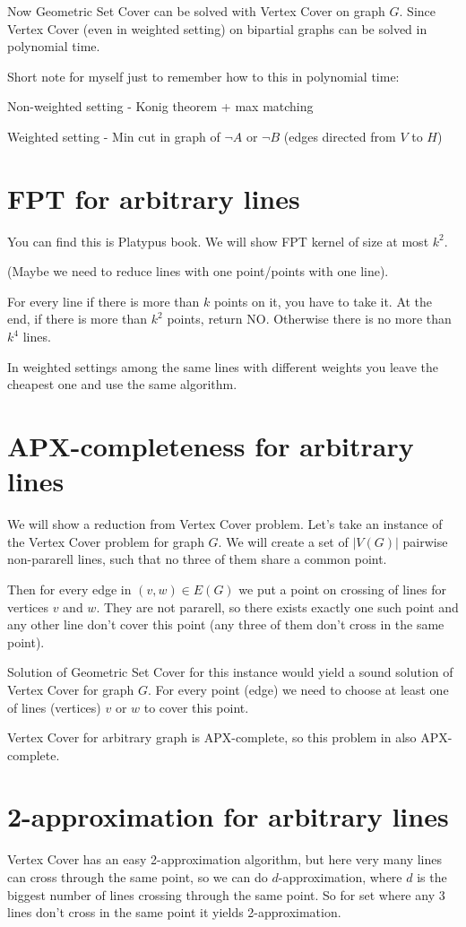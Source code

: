 \documentclass[en]{pracamgr}
\begin{document}
Now Geometric Set Cover can be solved with Vertex Cover on graph $G$.
Since Vertex Cover (even in weighted setting) 
on bipartial graphs can be solved in polynomial time.

Short note for myself just to remember how to this in polynomial time:

Non-weighted setting - Konig theorem + max matching

Weighted setting - Min cut in graph of $\neg A$ or $\neg B$
(edges directed from $V$ to $H$)

\section{FPT for arbitrary lines}
You can find this is Platypus book.
We will show FPT kernel of size at most $k^2$.

(Maybe we need to reduce lines with one point/points with one line).

For every line if there is more than $k$ points on it,
you have to take it. At the end, if there is more than $k^2$ points,
return NO.
Otherwise there is no more than $k^4$ lines.

In weighted settings among the same lines with different weights
you leave the cheapest one and use the same algorithm.

\section{APX-completeness for arbitrary lines}
We will show a reduction from Vertex Cover problem.
Let's take an instance of the Vertex Cover problem for graph $G$.
We will create a set of $|V(G)|$ pairwise non-pararell lines,
such that no three of them share a common point.

Then for every edge in $(v, w) \in E(G)$
we put a point on crossing of lines for vertices $v$ and $w$.
They are not pararell, so there exists exactly one such point
and any other line don't cover this point (any three of them don't
cross in the same point).

Solution of Geometric Set Cover for this instance would yield
a sound solution of Vertex Cover for graph $G$.
For every point (edge) we need to choose at least one of
lines (vertices) $v$ or $w$ to cover this point.

Vertex Cover for arbitrary graph is APX-complete,
so this problem in also APX-complete.

\section{2-approximation for arbitrary lines}
Vertex Cover has an easy 2-approximation algorithm,
but here very many lines can cross through
the same point, so we can do $d$-approximation,
where $d$ is the biggest number of lines crossing through the same point.
So for set where any 3 lines don't cross in the same point
it yields 2-approximation.
\end{document}
